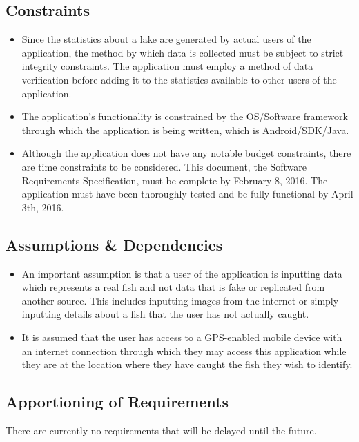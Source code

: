 \documentclass{article}
\begin{document}
\subsection{Constraints}
\begin{itemize}
	\item
	Since the statistics about a lake are generated by actual users of the application, the method by which data is collected must be subject to strict integrity constraints. The application must employ a method of data verification before adding it to the statistics available to other users of the application. 

	\item
	The application's functionality is constrained by the OS/Software framework through which the application is being written, which is Android/SDK/Java.

	\item
	Although the application does not have any notable budget constraints, there are time constraints to be considered. This document, the Software Requirements Specification, must be complete by February 8, 2016. The application must have been thoroughly tested and be fully functional by April 3th, 2016.
\end{itemize}

\subsection{Assumptions \& Dependencies}
\begin{itemize}
	\item
	An important assumption is that a user of the application is inputting data which represents a real fish and not data that is fake or replicated from another source. This includes inputting images from the internet or simply inputting details about a fish that the user has not actually caught.
	
	\item
	It is assumed that the user has access to a GPS-enabled mobile device with an internet connection through which they may access this application while they are at the location where they have caught the fish they wish to identify.
\end{itemize}

\subsection{Apportioning of Requirements}

There are currently no requirements that will be delayed until the future.
\end{document}
